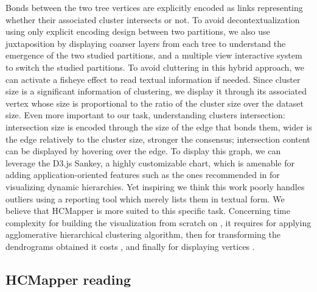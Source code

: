 \documentclass[10pt,conference,a4paper]{IEEEtran}
\begin{document}
Bonds between the two tree vertices are explicitly encoded as links representing whether their associated cluster intersects or not. To avoid decontextualization using only explicit encoding design between two partitions, we also use juxtaposition by displaying coarser layers from each tree to understand the emergence of the two studied partitions, and a multiple view interactive system to switch the studied partitions. To avoid cluttering in this hybrid approach, we can activate a fisheye effect to read textual information if needed. Since cluster size is a significant information of clustering, we display it through its associated vertex whose size is proportional to the ratio of the cluster size over the dataset size. Even more important to our task, understanding clusters intersection: intersection size is encoded through the size of the edge that bonds them, wider is the edge relatively to the cluster size, stronger the consensus; intersection content can be displayed by hovering over the edge. To display this graph, we can leverage the D3.js \cite{bostock2011d3} Sankey, a highly customizable chart, which is amenable for adding application-oriented features such as the ones recommended in \cite{guerra2013visualizing} for visualizing dynamic hierarchies. Yet inspiring we think this work poorly handles outliers using a reporting tool which merely lists them in textual form. We believe that HCMapper is more suited to this specific task.
Concerning time complexity for building the visualization from scratch on , it requires  for applying agglomerative hierarchical clustering algorithm, then for transforming the dendrograms obtained it costs , and finally for displaying  vertices . 

\subsection{HCMapper reading}
\end{document}
